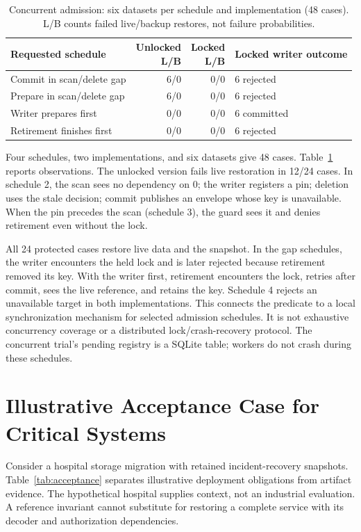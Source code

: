 \documentclass[10pt,conference]{IEEEtran}
\begin{document}
\begin{table}[t]
\caption{Concurrent admission: six datasets per schedule and implementation (48 cases). L/B counts failed live/backup restores, not failure probabilities.}
\label{tab:concurrency}\centering
\begin{tabular}{@{}p{2.8cm}rrp{2.1cm}@{}}
\toprule
Requested schedule & \shortstack{Unlocked\\L/B} & \shortstack{Locked\\L/B} & Locked writer outcome\\
\midrule
Commit in scan/delete gap & 6/0 & 0/0 & 6 rejected\\
Prepare in scan/delete gap & 6/0 & 0/0 & 6 rejected\\
Writer prepares first & 0/0 & 0/0 & 6 committed\\
Retirement finishes first & 0/0 & 0/0 & 6 rejected\\
\bottomrule
\end{tabular}
\end{table}

Four schedules, two implementations, and six datasets give 48 cases. Table~\ref{tab:concurrency} reports observations. The unlocked version fails live restoration in 12/24 cases. In schedule 2, the scan sees no dependency on 0; the writer registers a pin; deletion uses the stale decision; commit publishes an envelope whose key is unavailable. When the pin precedes the scan (schedule 3), the guard sees it and denies retirement even without the lock.

All 24 protected cases restore live data and the snapshot. In the gap schedules, the writer encounters the held lock and is later rejected because retirement removed its key. With the writer first, retirement encounters the lock, retries after commit, sees the live reference, and retains the key. Schedule 4 rejects an unavailable target in both implementations. This connects the predicate to a local synchronization mechanism for selected admission schedules. It is not exhaustive concurrency coverage or a distributed lock/crash-recovery protocol. The concurrent trial's pending registry is a SQLite table; workers do not crash during these schedules.

\section{Illustrative Acceptance Case for Critical Systems}
Consider a hospital storage migration with retained incident-recovery snapshots. Table~\ref{tab:acceptance} separates illustrative deployment obligations from artifact evidence. The hypothetical hospital supplies context, not an industrial evaluation. A reference invariant cannot substitute for restoring a complete service with its decoder and authorization dependencies.
\end{document}
